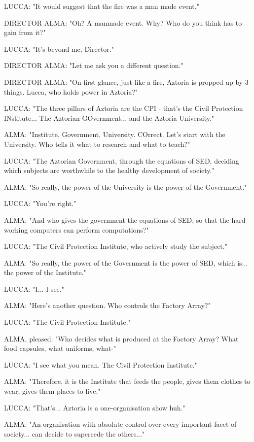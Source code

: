 \documentclass[11pt]{article}
\begin{document}
LUCCA: "It would suggest that the fire was a man made event."

DIRECTOR ALMA: "Oh? A manmade event.
Why? Who do you think has to gain from it?"

LUCCA: "It's beyond me, Director."

DIRECTOR ALMA: "Let me ask you a different question."

DIRECTOR ALMA: "On first glance, just like a fire, Aztoria is propped up by 3 things.
Lucca, who holds power in Aztoria?"

LUCCA: "The three pillars of Aztoria are the CPI - that's the Civil Protection INstitute... The Aztorian GOvernment... and the Aztoria University."

ALMA: "Institute, Government, University. COrrect.
Let's start with the University.
Who tells it what to research and what to teach?"

LUCCA: "The Aztorian Government, through the equations of SED, deciding which subjects are worthwhile to the healthy development of society."

ALMA: "So really, the power of the University is the power of the Government."

LUCCA: "You're right."

ALMA: "And who gives the government the equations of SED, so that the hard working computers can perform computations?"

LUCCA: "The Civil Protection Institute, who actively study the subject."

ALMA: "So really, the power of the Government is the power of SED, which is... the power of the Institute."

LUCCA: "I... I see."

ALMA: "Here's another question. 
Who controls the Factory Array?"

LUCCA: "The Civil Protection Institute."

ALMA, pleased: "Who decides what is produced at the Factory Array?
What food capsules, what uniforms, what-"

LUCCA: "I see what you mean. The Civil Protection Institute."

ALMA: "Therefore, it is the Institute that feeds the people, gives them clothes to wear, gives them places to live."

LUCCA: "That's... Aztoria is a one-organisation show huh."

ALMA: "An organisation with absolute control over every important facet of society... can decide to supercede the others..."
\end{document}
